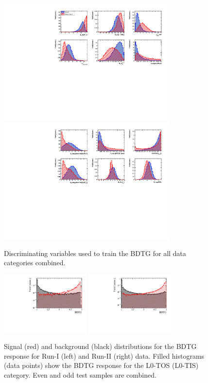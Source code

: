 \begin{figure}[h]
\centering
\includegraphics[height=!,width=0.8\textwidth]{figs/TMVA/BDTG_Data_all_all_all/variables_id_c1.pdf}
\includegraphics[height=!,width=0.8\textwidth]{figs/TMVA/BDTG_Data_all_all_all/variables_id_c2.pdf}
\caption{Discriminating variables used to train the BDTG for all data categories combined.}
\label{fig:varsBDT}
\end{figure}

\begin{figure}[h]
\centering
\includegraphics[height=!,width=0.4\textwidth]{figs/TMVA/BDTG_Run1.pdf}
\includegraphics[height=!,width=0.4\textwidth]{figs/TMVA/BDTG_Run2.pdf}
\caption{Signal (red) and background (black) distributions for the BDTG response for Run-I (left) and Run-II (right) data. 
Filled histograms (data points) show the BDTG response for the \textsf{L0-TOS} (\textsf{L0-TIS}) category.
Even and odd test samples are combined.
}
\label{fig:BDTG}
\end{figure}


